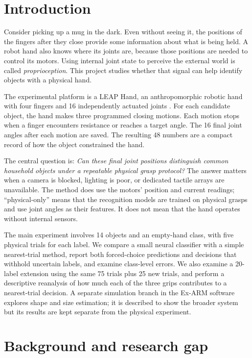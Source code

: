\documentclass[12pt,a4paper]{article}
\begin{document}
\section{Introduction}

Consider picking up a mug in the dark. Even without seeing it, the positions of the fingers after they close provide some information about what is being held. A robot hand also knows where its joints are, because those positions are needed to control its motors. Using internal joint state to perceive the external world is called \emph{proprioception}. This project studies whether that signal can help identify objects with a physical hand.

The experimental platform is a LEAP Hand, an anthropomorphic robotic hand with four fingers and 16 independently actuated joints \cite{shaw2023}. For each candidate object, the hand makes three programmed closing motions. Each motion stops when a finger encounters resistance or reaches a target angle. The 16 final joint angles after each motion are saved. The resulting 48 numbers are a compact record of how the object constrained the hand.

The central question is: \emph{Can these final joint positions distinguish common household objects under a repeatable physical grasp protocol?} The answer matters when a camera is blocked, lighting is poor, or dedicated tactile arrays are unavailable. The method does use the motors' position and current readings; ``physical-only'' means that the recognition models are trained on physical grasps and use joint angles as their features. It does not mean that the hand operates without internal sensors.

The main experiment involves 14 objects and an empty-hand class, with five physical trials for each label. We compare a small neural classifier with a simple nearest-trial method, report both forced-choice predictions and decisions that withhold uncertain labels, and examine class-level errors. We also examine a 20-label extension using the same 75 trials plus 25 new trials, and perform a descriptive reanalysis of how much each of the three grips contributes to a nearest-trial decision. A separate simulation branch in the Ex-ARM software explores shape and size estimation; it is described to show the broader system but its results are kept separate from the physical experiment.

\section{Background and research gap}
\end{document}
